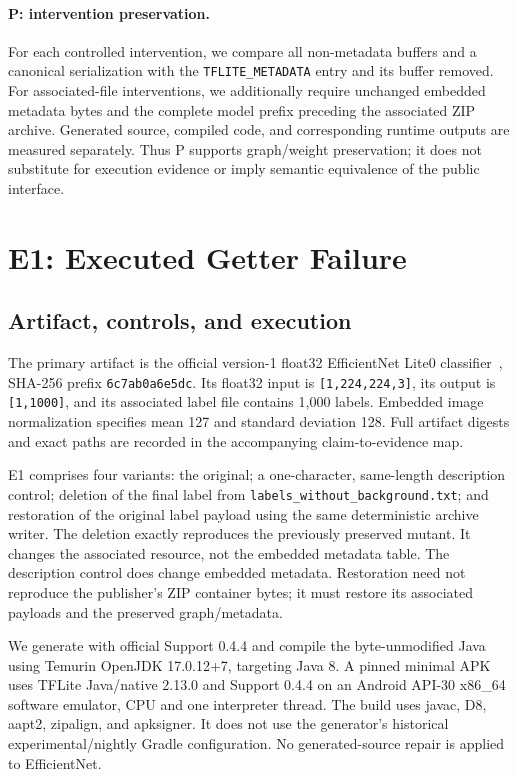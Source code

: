 \documentclass[10pt,twocolumn,letterpaper]{article}
\newcommand{\code}[1]{\texttt{#1}}
\begin{document}
\paragraph{P: intervention preservation.}
For each controlled intervention, we compare all non-metadata buffers and a canonical serialization with the \code{TFLITE\_METADATA} entry and its buffer removed. For associated-file interventions, we additionally require unchanged embedded metadata bytes and the complete model prefix preceding the associated ZIP archive. Generated source, compiled code, and corresponding runtime outputs are measured separately. Thus P supports graph/weight preservation; it does not substitute for execution evidence or imply semantic equivalence of the public interface.

\section{E1: Executed Getter Failure}
\label{sec:e1}
\subsection{Artifact, controls, and execution}
The primary artifact is the official version-1 float32 EfficientNet Lite0 classifier~\cite{efficientnet}, SHA-256 prefix \code{6c7ab0a6e5dc}. Its float32 input is \code{[1,224,224,3]}, its output is \code{[1,1000]}, and its associated label file contains 1,000 labels. Embedded image normalization specifies mean 127 and standard deviation 128. Full artifact digests and exact paths are recorded in the accompanying claim-to-evidence map.

E1 comprises four variants: the original; a one-character, same-length description control; deletion of the final label from \code{labels\_without\_background.txt}; and restoration of the original label payload using the same deterministic archive writer. The deletion exactly reproduces the previously preserved mutant. It changes the associated resource, not the embedded metadata table. The description control does change embedded metadata. Restoration need not reproduce the publisher's ZIP container bytes; it must restore its associated payloads and the preserved graph/metadata.

We generate with official Support 0.4.4 and compile the byte-unmodified Java using Temurin OpenJDK 17.0.12+7, targeting Java 8. A pinned minimal APK uses TFLite Java/native 2.13.0 and Support 0.4.4 on an Android API-30 x86\_64 software emulator, CPU and one interpreter thread. The build uses javac, D8, aapt2, zipalign, and apksigner. It does not use the generator's historical experimental/nightly Gradle configuration. No generated-source repair is applied to EfficientNet.
\end{document}
